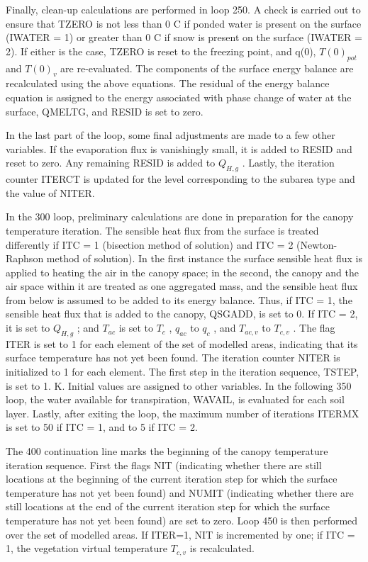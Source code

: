 Finally, clean-\/up calculations are performed in loop 250. A check is carried out to ensure that T\+Z\+E\+R\+O is not less than 0 C if ponded water is present on the surface (I\+W\+A\+T\+E\+R = 1) or greater than 0 C if snow is present on the surface (I\+W\+A\+T\+E\+R = 2). If either is the case, T\+Z\+E\+R\+O is reset to the freezing point, and q(0), $T(0)_{pot}$ and $T(0)_v$ are re-\/evaluated. The components of the surface energy balance are recalculated using the above equations. The residual of the energy balance equation is assigned to the energy associated with phase change of water at the surface, Q\+M\+E\+L\+T\+G, and R\+E\+S\+I\+D is set to zero.

In the last part of the loop, some final adjustments are made to a few other variables. If the evaporation flux is vanishingly small, it is added to R\+E\+S\+I\+D and reset to zero. Any remaining R\+E\+S\+I\+D is added to $Q_{H,g}$ . Lastly, the iteration counter I\+T\+E\+R\+C\+T is updated for the level corresponding to the subarea type and the value of N\+I\+T\+E\+R.

In the 300 loop, preliminary calculations are done in preparation for the canopy temperature iteration. The sensible heat flux from the surface is treated differently if I\+T\+C = 1 (bisection method of solution) and I\+T\+C = 2 (Newton-\/\+Raphson method of solution). In the first instance the surface sensible heat flux is applied to heating the air in the canopy space; in the second, the canopy and the air space within it are treated as one aggregated mass, and the sensible heat flux from below is assumed to be added to its energy balance. Thus, if I\+T\+C = 1, the sensible heat flux that is added to the canopy, Q\+S\+G\+A\+D\+D, is set to 0. If I\+T\+C = 2, it is set to $Q_{H,g}$ ; and $T_{ac}$ is set to $T_c$ , $q_{ac}$ to $q_c$ , and $T_{ac,v}$ to $T_{c,v}$ . The flag I\+T\+E\+R is set to 1 for each element of the set of modelled areas, indicating that its surface temperature has not yet been found. The iteration counter N\+I\+T\+E\+R is initialized to 1 for each element. The first step in the iteration sequence, T\+S\+T\+E\+P, is set to 1. K. Initial values are assigned to other variables. In the following 350 loop, the water available for transpiration, W\+A\+V\+A\+I\+L, is evaluated for each soil layer. Lastly, after exiting the loop, the maximum number of iterations I\+T\+E\+R\+M\+X is set to 50 if I\+T\+C = 1, and to 5 if I\+T\+C = 2.

The 400 continuation line marks the beginning of the canopy temperature iteration sequence. First the flags N\+I\+T (indicating whether there are still locations at the beginning of the current iteration step for which the surface temperature has not yet been found) and N\+U\+M\+I\+T (indicating whether there are still locations at the end of the current iteration step for which the surface temperature has not yet been found) are set to zero. Loop 450 is then performed over the set of modelled areas. If I\+T\+E\+R=1, N\+I\+T is incremented by one; if I\+T\+C = 1, the vegetation virtual temperature $T_{c,v}$ is recalculated.

